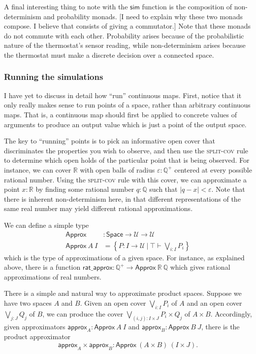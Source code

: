 \documentclass{article}           %
\newcommand{\R}{\mathbb{R}}
\newcommand{\rat}{\mathbb{Q}}
\newcommand{\suchthat}{\ |\ }
\newcommand{\irule}[1]{\textsc{#1}}
\newcommand{\Type}{\mathcal{U}}
\newcommand{\Space}{\mathsf{Space}}
\begin{document}
A final interesting thing to note with the $\mathsf{sim}$ function is the composition of non-determinism and probability monads. [I need to explain why these two monads compose. I believe that consists of giving a commutator.] Note that these monads do not commute with each other. Probability arises because of the probabilistic nature of the thermostat's sensor reading, while non-determinism arises because the thermostat must make a discrete decision over a connected space.

\subsubsection{Running the simulations}

I have yet to discuss in detail how ``run'' continuous maps. First, notice that it only really makes sense to run points of a space, rather than arbitrary continuous maps. That is, a continuous map should first be applied to concrete values of arguments to produce an output value which is just a point of the output space.

The key to ``running'' points is to pick an informative open cover that discriminates the properties you wish to observe, and then use the \irule{split-cov} rule to determine which open holds of the particular point that is being observed. For instance, we can cover $\R$ with open balls of radius $\varepsilon : \rat^+$ centered at every possible rational number. Using the \irule{split-cov} rule with this cover, we can approximate a point $x : \R$ by finding some rational number $q : \rat$ such that $|q - x| < \varepsilon$. Note that there is inherent non-determinism here, in that different representations of the same real number may yield different rational approximations.

We can define a simple type 
\begin{align*}
\mathsf{Approx} &: \Space \to \Type \to \Type
\\ \mathsf{Approx}\ A\  I &= \left\{ P : I \to \Type \suchthat \top \vdash \bigvee_{i : I} P_i \right\}
\end{align*}
which is the type of approximations of a given space. For instance, as explained above, there is a function $\mathsf{rat\_approx} : \rat^+ \to \mathsf{Approx}\ \R\ \rat$ which gives rational approximations of real numbers.

There is a simple and natural way to approximate product spaces. Suppose we have two spaces $A$ and $B$. Given an open cover $\bigvee_{i : I} P_i$ of $A$ and an open cover $\bigvee_{j : J} Q_j$ of $B$, we can produce the cover $\bigvee_{(i, j) : I \times J} P_i \times Q_j$ of $A \times B$. Accordingly, given approximators $\mathsf{approx}_A : \mathsf{Approx}\ A\ I$ and $\mathsf{approx}_B : \mathsf{Approx}\ B\ J$, there is the product approximator
\[
\mathsf{approx}_A \times \mathsf{approx}_B : \mathsf{Approx}\ (A \times B)\ (I \times J).
\]
\end{document}
